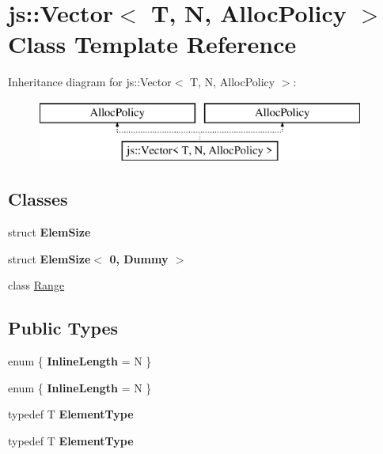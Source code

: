 \hypertarget{classjs_1_1_vector}{\section{js\-:\-:Vector$<$ T, N, Alloc\-Policy $>$ Class Template Reference}
\label{classjs_1_1_vector}
}
Inheritance diagram for js\-:\-:Vector$<$ T, N, Alloc\-Policy $>$\-:\begin{figure}[H]
\begin{center}
\leavevmode
\includegraphics[height=2.000000cm]{classjs_1_1_vector}
\end{center}
\end{figure}
\subsection*{Classes}
\begin{DoxyCompactItemize}
\item 
struct {\bfseries Elem\-Size}
\item 
struct {\bfseries Elem\-Size$<$ 0, Dummy $>$}
\item 
class \hyperlink{classjs_1_1_vector_1_1_range}{Range}
\end{DoxyCompactItemize}
\subsection*{Public Types}
\begin{DoxyCompactItemize}
\item 
enum \{ {\bfseries Inline\-Length} =  N
 \}
\item 
enum \{ {\bfseries Inline\-Length} =  N
 \}
\item 
\hypertarget{classjs_1_1_vector_a8f587c6240a70748cdfdcae3c48cffda}{typedef T {\bfseries Element\-Type}}\label{classjs_1_1_vector_a8f587c6240a70748cdfdcae3c48cffda}

\item 
\hypertarget{classjs_1_1_vector_a8f587c6240a70748cdfdcae3c48cffda}{typedef T {\bfseries Element\-Type}}\label{classjs_1_1_vector_a8f587c6240a70748cdfdcae3c48cffda}

\end{DoxyCompactItemize}
